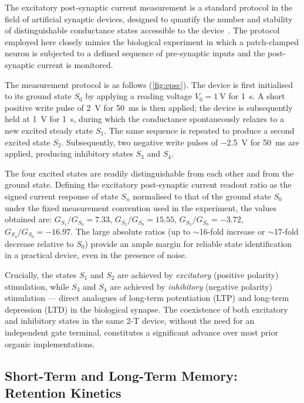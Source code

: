 \documentclass[12pt, a4paper, twoside]{report}
\newcommand{\EPSC}{excitatory post-synaptic current}
\begin{document}
The \EPSC{} measurement is a standard protocol in the field of artificial synaptic devices, designed to quantify the number and stability of distinguishable conductance states accessible to the device~\cite{Kim2018, VanDeBurgt2018}. The protocol employed here closely mimics the biological experiment in which a patch-clamped neuron is subjected to a defined sequence of pre-synaptic inputs and the post-synaptic current is monitored.

The measurement protocol is as follows (\cref{fig:epsc}). The device is first initialised to its ground state $S_0$ by applying a reading voltage $V_0 = \SI{+1}{\volt}$ for \SI{1}{\second}. A short positive write pulse of \SI{+2}{\volt} for \SI{50}{\milli\second} is then applied; the device is subsequently held at \SI{+1}{\volt} for \SI{1}{\second}, during which the conductance spontaneously relaxes to a new excited steady state $S_1$. The same sequence is repeated to produce a second excited state $S_2$. Subsequently, two negative write pulses of \SI{-2.5}{\volt} for \SI{50}{\milli\second} are applied, producing inhibitory states $S_3$ and $S_4$.

The four excited states are readily distinguishable from each other and from the ground state. Defining the \EPSC{} readout ratio as the signed current response of state $S_n$ normalised to that of the ground state $S_0$ under the fixed measurement convention used in the experiment, the values obtained are: $G_{S_1}/G_{S_0} = 7.33$, $G_{S_2}/G_{S_0} = 15.55$, $G_{S_3}/G_{S_0} = -3.72$, $G_{S_4}/G_{S_0} = -16.97$. The large absolute ratios (up to $\sim$16-fold increase or $\sim$17-fold decrease relative to $S_0$) provide an ample margin for reliable state identification in a practical device, even in the presence of noise.

Crucially, the states $S_1$ and $S_2$ are achieved by \textit{excitatory} (positive polarity) stimulation, while $S_3$ and $S_4$ are achieved by \textit{inhibitory} (negative polarity) stimulation — direct analogues of long-term potentiation (LTP) and long-term depression (LTD) in the biological synapse. The coexistence of both excitatory and inhibitory states in the same 2-T device, without the need for an independent gate terminal, constitutes a significant advance over most prior organic implementations.

\subsection{Short-Term and Long-Term Memory: Retention Kinetics}\label{subsec:stm_ltm}
\end{document}
